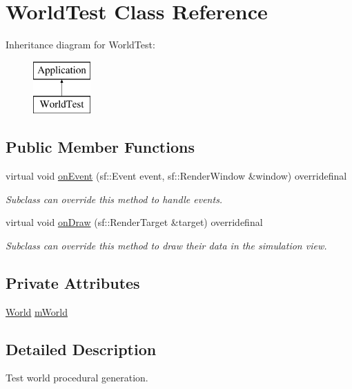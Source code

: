 \hypertarget{class_world_test}{\section{World\-Test Class Reference}
\label{class_world_test}
}
Inheritance diagram for World\-Test\-:\begin{figure}[H]
\begin{center}
\leavevmode
\includegraphics[height=2.000000cm]{class_world_test}
\end{center}
\end{figure}
\subsection*{Public Member Functions}
\begin{DoxyCompactItemize}
\item 
virtual void \hyperlink{class_world_test_aef2eb702d4f558c90308f8cfc0abb128}{on\-Event} (sf\-::\-Event event, sf\-::\-Render\-Window \&window) overridefinal
\begin{DoxyCompactList}\small\item\em Subclass can override this method to handle events. \end{DoxyCompactList}\item 
virtual void \hyperlink{class_world_test_a2dbf8fe3f7de226b01cd284d8b44816e}{on\-Draw} (sf\-::\-Render\-Target \&target) overridefinal
\begin{DoxyCompactList}\small\item\em Subclass can override this method to draw their data in the simulation view. \end{DoxyCompactList}\end{DoxyCompactItemize}
\subsection*{Private Attributes}
\begin{DoxyCompactItemize}
\item 
\hyperlink{class_world}{World} \hyperlink{class_world_test_aa61038592e5857eb9b71d458ccb62cc2}{m\-World}
\end{DoxyCompactItemize}


\subsection{Detailed Description}
Test world procedural generation.


